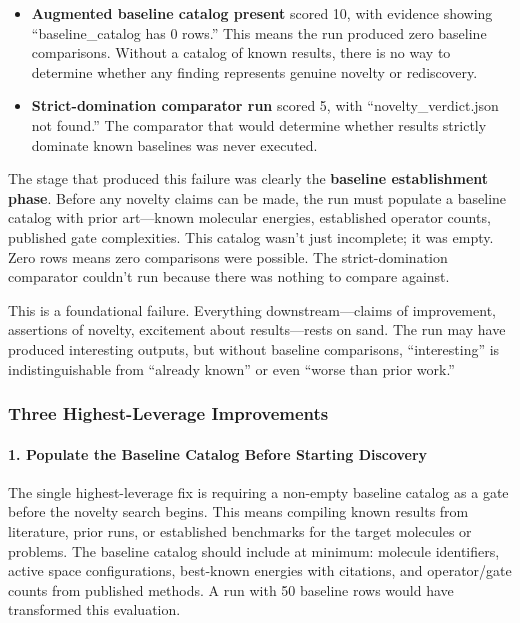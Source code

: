 \documentclass[10pt,letterpaper]{article}
\begin{document}
\begin{itemize}
\item
  \textbf{Augmented baseline catalog present} scored 10, with evidence showing ``baseline\_catalog has 0 rows.'' This means the run produced zero baseline comparisons. Without a catalog of known results, there is no way to determine whether any finding represents genuine novelty or rediscovery.
\item
  \textbf{Strict-domination comparator run} scored 5, with ``novelty\_verdict.json not found.'' The comparator that would determine whether results strictly dominate known baselines was never executed.
\end{itemize}

The stage that produced this failure was clearly the \textbf{baseline establishment phase}. Before any novelty claims can be made, the run must populate a baseline catalog with prior art---known molecular energies, established operator counts, published gate complexities. This catalog wasn't just incomplete; it was empty. Zero rows means zero comparisons were possible. The strict-domination comparator couldn't run because there was nothing to compare against.

This is a foundational failure. Everything downstream---claims of improvement, assertions of novelty, excitement about results---rests on sand. The run may have produced interesting outputs, but without baseline comparisons, ``interesting'' is indistinguishable from ``already known'' or even ``worse than prior work.''

\hypertarget{three-highest-leverage-improvements}{%
\subsubsection{Three Highest-Leverage Improvements}\label{three-highest-leverage-improvements}}

\hypertarget{populate-the-baseline-catalog-before-starting-discovery}{%
\paragraph{1. Populate the Baseline Catalog Before Starting Discovery}\label{populate-the-baseline-catalog-before-starting-discovery}}

The single highest-leverage fix is requiring a non-empty baseline catalog as a gate before the novelty search begins. This means compiling known results from literature, prior runs, or established benchmarks for the target molecules or problems. The baseline catalog should include at minimum: molecule identifiers, active space configurations, best-known energies with citations, and operator/gate counts from published methods. A run with 50 baseline rows would have transformed this evaluation.
\end{document}
